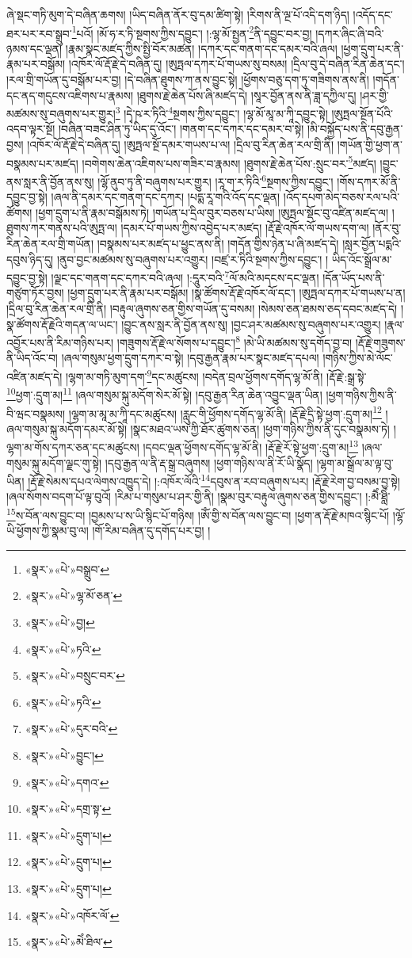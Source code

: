 ཞེ་སྡང་གཏི་མུག་དེ་བཞིན་ཆགས། །ཡིད་བཞིན་ནོར་བུ་དམ་ཚིག་སྟེ། །རིགས་ནི་ལྔ་པོ་འདི་དག་ཉིད། །འདོད་དང་ཐར་པར་རབ་སྒྲུབ་\footnote{«སྣར་»«པེ་»བསྒྲུབ་}པའོ། །མོ་ཧ་ར་ཏི་སྔགས་ཀྱིས་དབྱུང་། །:ལྷ་མོ་སྤྱན་\footnote{«སྣར་»«པེ་»ལྷ་མོ་ཅན་}ནི་དབྱུང་བར་བྱ། །དཀར་ཞིང་ཞི་བའི་ཉམས་དང་ལྡན། །རྣམ་སྣང་མཛད་ཀྱིས་སྤྱི་བོར་མཚན། །དཀར་དང་གནག་དང་དམར་བའི་ཞལ། །ཕྱག་དྲུག་པར་ནི་རྣམ་པར་བསྒོམ། །འཁོར་ལོ་རྡོ་རྗེ་དེ་བཞིན་དུ། །ཨུཏྤལ་དཀར་པོ་གཡས་སུ་བསམ། །དྲིལ་བུ་དེ་བཞིན་རིན་ཆེན་དང་། །རལ་གྲི་གཡོན་དུ་བསྒོམ་པར་བྱ། །དེ་བཞིན་ཐུགས་ཀ་ནས་བྱུང་སྟེ། །ཕྱོགས་བཅུ་དག་ཏུ་གཟིགས་ནས་ནི། །གདོན་དང་ནད་གདུངས་འཇིགས་པ་རྣམས། །ཐུགས་རྗེ་ཆེན་པོས་ཞི་མཛད་དེ། །སཱར་བྱོན་ནས་ནི་ཟླ་དཀྱིལ་དུ། །ཤར་གྱི་མཚམས་སུ་བཞུགས་པར་གྱུར།\footnote{«སྣར་»«པེ་»བྱ།} །དྭེ་ཥ་ར་ཏིའི་\footnote{«སྣར་»«པེ་»ཏའི་}སྔགས་ཀྱིས་དབྱུང་། །ལྷ་མོ་མཱ་མ་ཀཱི་དབྱུང་སྟེ། །ཨུཏྤལ་སྔོན་པོའི་འདབ་ལྟར་སྔོ། །བཞིན་བཟང་ཤིན་ཏུ་ཡིད་དུ་འོང་། །གནག་དང་དཀར་དང་དམར་བ་སྟེ། །མི་བསྐྱོད་པས་ནི་དབུ་རྒྱན་བྱས། །འཁོར་ལོ་རྡོ་རྗེ་དེ་བཞིན་དུ། །ཨུཏྤལ་སྔོ་དམར་གཡས་པ་ལ། །དྲིལ་བུ་རིན་ཆེན་རལ་གྲི་ནི། །གཡོན་གྱི་ཕྱག་ན་བསྣམས་པར་མཛད། །བགེགས་ཆེན་འཇིགས་པས་གཟིར་བ་རྣམས། །ཐུགས་རྗེ་ཆེན་པོས་:སྲུང་བར་\footnote{«སྣར་»«པེ་»བསྲུང་བར་}མཛད། །བྱུང་ནས་སླར་ནི་བྱོན་ནས་སུ། །ལྷོ་ནུབ་ཏུ་ནི་བཞུགས་པར་གྱུར། །རཱ་ག་ར་ཏིའི་\footnote{«སྣར་»«པེ་»ཏའི་}སྔགས་ཀྱིས་དབྱུང་། །གོས་དཀར་མོ་ནི་དབྱུང་བྱ་སྟེ། །ཞལ་ནི་དམར་དང་གནག་དང་དཀར། །པདྨ་རཱ་གའི་འོད་དང་ལྡན། །འོད་དཔག་མེད་བཅས་རལ་པའི་ཚོགས། །ཕྱག་དྲུག་པ་ནི་རྣམ་བསྒོམས་ཏེ། །གཡོན་པ་དྲིལ་བུར་བཅས་པ་ཡིས། །ཨུཏྤལ་སྡོང་བུ་འཛིན་མཛད་ལ། །ཐུགས་ཀར་གནས་པའི་ཨུཏྤ་ལ། །དམར་པོ་གཡས་ཀྱིས་འབྱེད་པར་མཛད། །རྡོ་རྗེ་འཁོར་ལོ་གཡས་དག་ལ། །ནོར་བུ་རིན་ཆེན་རལ་གྲི་གཡོན། །བསྣམས་པར་མཛད་པ་ཕྱུང་ནས་ནི། །གདོན་གྱིས་ཉེན་པ་ཞི་མཛད་དེ། །སླར་བྱོན་པདྨའི་དབུས་ཉིད་དུ། །ནུབ་བྱང་མཚམས་སུ་བཞུགས་པར་འགྱུར། །བཛྲ་ར་ཏིའི་སྔགས་ཀྱིས་དབྱུང་། །
ཡིད་འོང་སྒྲོལ་མ་དབྱུང་བྱ་སྟེ། །ལྗང་དང་གནག་དང་དཀར་བའི་ཞལ། །:དཱུར་བའི་\footnote{«སྣར་»«པེ་»དུར་བའི་}ལོ་མའི་མདངས་དང་ལྡན། །དོན་ཡོད་པས་ནི་གཙུག་ཏོར་བྱས། །ཕྱག་དྲུག་པར་ནི་རྣམ་པར་བསྒོམ། །སྣ་ཚོགས་རྡོ་རྗེ་འཁོར་ལོ་དང་། །ཨུཏྤལ་དཀར་པོ་གཡས་པ་ན། །དྲིལ་བུ་རིན་ཆེན་རལ་གྲི་ནི། །བརྟུལ་ཞུགས་ཅན་གྱིས་གཡོན་དུ་བསམ། །སེམས་ཅན་ཐམས་ཅད་དབང་མཛད་དེ། །སྣ་ཚོགས་རྡོ་རྗེའི་གདན་ལ་ཡང་། །བྱུང་ནས་སླར་ནི་བྱོན་ནས་སུ། །བྱང་ཤར་མཚམས་སུ་བཞུགས་པར་འགྱུར། །རྣལ་འབྱོར་པས་ནི་རིམ་གཉིས་པར། །གཟུགས་རྡོ་རྗེ་ལ་སོགས་པ་དབྱུང་།\footnote{«སྣར་»«པེ་»བྱུང་།} །མེ་ཡི་མཚམས་སུ་དགོད་བྱ་བ། །རྡོ་རྗེ་གཟུགས་ནི་ཡིད་འོང་བ། །ཞལ་གསུམ་ཕྱག་དྲུག་དཀར་བ་སྟེ། །དབུ་རྒྱན་རྣམ་པར་སྣང་མཛད་དཔལ། །གཉིས་ཀྱིས་མེ་ལོང་འཛིན་མཛད་དེ། །ལྷག་མ་གཏི་མུག་དག་\footnote{«སྣར་»«པེ་»དགའ་}དང་མཚུངས། །བདེན་བྲལ་ཕྱོགས་དགོད་ལྷ་མོ་ནི། །རྡོ་རྗེ་:སྒྲ་སྟེ་\footnote{«སྣར་»«པེ་»དགྲ་སྟ་}ཕྱག་:དྲུག་མ།\footnote{«སྣར་»«པེ་»དྲུག་པ།} །ཞལ་གསུམ་སྐུ་མདོག་སེར་མོ་སྟེ། །དབུ་རྒྱན་རིན་ཆེན་འབྱུང་ལྡན་ཡིན། །ཕྱག་གཉིས་ཀྱིས་ནི་བི་ཝང་བསྣམས། །ལྷག་མ་མཱ་མ་ཀཱི་དང་མཚུངས། །རླུང་གི་ཕྱོགས་དགོད་ལྷ་མོ་ནི། །རྡོ་རྗེ་དྲི་སྟེ་ཕྱག་:དྲུག་མ།\footnote{«སྣར་»«པེ་»དྲུག་པ།} །ཞལ་གསུམ་སྐུ་མདོག་དམར་མོ་སྟེ། །སྣང་མཐའ་ཡས་ཀྱི་ཐོར་ཚུགས་ཅན། །ཕྱག་གཉིས་ཀྱིས་ནི་དུང་བསྣམས་ཏེ། །ལྷག་མ་གོས་དཀར་ཅན་དང་མཚུངས། །དབང་ལྡན་ཕྱོགས་དགོད་ལྷ་མོ་ནི། །རྡོ་རྗེ་རོ་སྟེ་ཕྱག་:དྲུག་མ།\footnote{«སྣར་»«པེ་»དྲུག་པ།} །ཞལ་གསུམ་སྐུ་མདོག་ལྗང་གུ་སྟེ། །དབུ་རྒྱན་ལ་ནི་རྡ་སྒྲ་བཞུགས། །ཕྱག་གཉིས་ལ་ནི་རོ་ཡི་སྣོད། །ལྷག་མ་སྒྲོལ་མ་ལྟ་བུ་ཡིན། །རྡོ་རྗེ་སེམས་དཔའ་ལེགས་འཁྱུད་དེ། །:འཁོར་ལོའི་\footnote{«སྣར་»«པེ་»འཁོར་ལོ་}དབུས་ན་རབ་བཞུགས་པར། །རྡོ་རྗེ་རེག་བྱ་བསམ་བྱ་སྟེ། །ཞལ་སོགས་བདག་པོ་ལྟ་བུའོ། །རིམ་པ་གསུམ་པ་ཤར་གྱི་ནི། །སྣམ་བུར་བརྟུལ་ཞུགས་ཅན་གྱིས་དབྱུང་། །:མཻཾ་ཐླིཾ་\footnote{«སྣར་»«པེ་»མེཾ་ཐིལ་}ས་བོན་ལས་བྱུང་བ། །བྱམས་པ་ས་ཡི་སྙིང་པོ་གཉིས། །ཨོཾ་གྱི་ས་བོན་ལས་བྱུང་བ། །ཕྱག་ན་རྡོ་རྗེ་མཁའ་སྙིང་པོ། །ལྷོ་ཡི་ཕྱོགས་ཀྱི་སྣམ་བུ་ལ། །གོ་རིམ་བཞིན་དུ་དགོད་པར་བྱ། །
